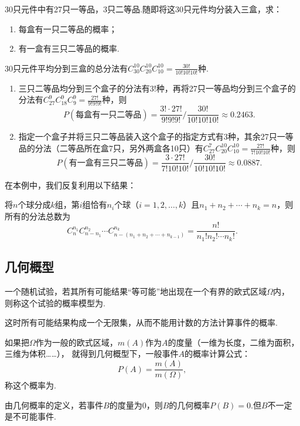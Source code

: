 \begin{example}
30只元件中有27只一等品，3只二等品.随即将这30只元件均分装入三盒，求：\begin{enumerate}
\item 每盒有一只二等品的概率；
\item 有一盒有三只二等品的概率.
\end{enumerate}
\begin{solution}
30只元件平均分到三盒的总分法有\(C_{30}^{10} C_{20}^{10} C_{10}^{10} = \frac{30!}{10! 10! 10!}\)种.
\begin{enumerate}
\item 三只二等品均分到三个盒子的分法有\(3!\)种，再将27只一等品均分到三个盒子的分法有\(C_{27}^9 C_{18}^9 C_9^9 = \frac{27!}{9! 9! 9!}\)种，则\[
P(\text{每盒有一只二等品})=\frac{3! \cdot 27!}{9! 9! 9!} \bigg/ \frac{30!}{10! 10! 10!} \approx 0.2463.
\]
\item 指定一个盒子并将三只二等品装入这个盒子的指定方式有\(3\)种，其余27只一等品的分法（二等品所在盒7只，另外两盒各10只）有\(C_{27}^7 C_{20}^{10} C_{10}^{10} = \frac{27!}{7! 10! 10!}\)种，则\[
P(\text{有一盒有三只二等品}) = \frac{3 \cdot 27!}{7! 10! 10!} \bigg/ \frac{30!}{10! 10! 10!} \approx 0.0887.
\]
\end{enumerate}
\end{solution}
在本例中，我们反复利用以下结果：

将\(n\)个球分成\(k\)组，第\(i\)组恰有\(n_i\)个球（\(i=1,2,\dotsc,k\)）且\(n_1+n_2+\dotsb+n_k=n\)，则所有的分法总数为\begin{equation}
C_n^{n_1} C_{n-n_1}^{n_2} \dotsm C_{n-(n_1+n_2+\dotsb+n_{k-1})}^{n_k}
= \frac{n!}{n_1! n_2! \dotsm n_k!}.
\end{equation}
\end{example}

\subsection{几何概型}
\begin{definition}
一个随机试验，若其所有可能结果“等可能”地出现在一个有界的欧式区域\(\Omega\)内，
则称这个试验的概率模型为.
\end{definition}
这时所有可能结果构成一个无限集，从而不能用计数的方法计算事件的概率.

\begin{definition}
如果把\(\Omega\)作为一般的欧式区域，\(m(A)\)作为\(A\)的度量（一维为长度，二维为面积，三维为体积……），
就得到几何概型下，一般事件\(A\)的概率计算公式：\[
P(A) = \frac{m(A)}{m(\Omega)},
\]称这个概率为.
\end{definition}
由几何概率的定义，若事件\(B\)的度量为0，则\(B\)的几何概率\(P(B)=0\).但\(B\)不一定是不可能事件.


